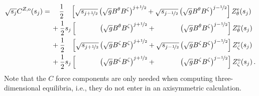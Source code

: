 \begin{align}
  \sqrt{s_j} C^{Z,\mathrm{o}} (s_j)
  =&\, \phantom{+}~ \frac{1}{2} \phantom{s_j} \left[            \sqrt{s_{j+\half}}  \left( \sqrt{g} B^\theta  B^\zeta \right)^{j+\half}
                                                     +          \sqrt{s_{j-\half}}  \left( \sqrt{g} B^\theta  B^\zeta \right)^{j-\half} \right] Z_\theta^\mathrm{e}(s_j) \nonumber \\
  ~&\,          +   \frac{1}{2}          s_j  \left[   \phantom{\sqrt{s_{j+\half}}} \left( \sqrt{g} B^\theta  B^\zeta \right)^{j+\half}
                                                     + \phantom{\sqrt{s_{j-\half}}} \left( \sqrt{g} B^\theta  B^\zeta \right)^{j-\half} \right] Z_\theta^\mathrm{o}(s_j) \nonumber \\
  ~&\,          +   \frac{1}{2} \phantom{s_j} \left[            \sqrt{s_{j+\half}}  \left( \sqrt{g}  B^\zeta  B^\zeta \right)^{j+\half}
                                                     +          \sqrt{s_{j-\half}}  \left( \sqrt{g}  B^\zeta  B^\zeta \right)^{j-\half} \right]  Z_\zeta^\mathrm{e}(s_j) \nonumber \\
  ~&\,          +   \frac{1}{2}          s_j  \left[   \phantom{\sqrt{s_{j+\half}}} \left( \sqrt{g}  B^\zeta  B^\zeta \right)^{j+\half}
                                                     + \phantom{\sqrt{s_{j-\half}}} \left( \sqrt{g}  B^\zeta  B^\zeta \right)^{j-\half} \right]  Z_\zeta^\mathrm{o}(s_j) \label{eqn:czmn_o} \, .
\end{align}
Note that the $C$ force components are only needed when computing three-dimensional equilibria,
i.e., they do not enter in an axisymmetric calculation.

\FloatBarrier
\newpage
